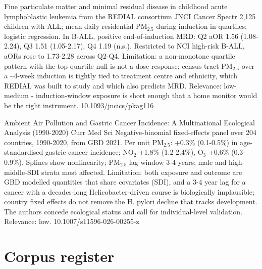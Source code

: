 \documentclass[10pt]{article}
\begin{document}
{Fine particulate matter and minimal residual disease in childhood acute lymphoblastic leukemia from the REDIAL consortium}
{JNCI Cancer Spectr}
{2,125 children with ALL; mean daily residential PM$_{2.5}$ during induction in quartiles; logistic regression. In B-ALL, positive end-of-induction MRD: Q2 aOR 1.56 (1.08-2.24), Q3 1.51 (1.05-2.17), Q4 1.19 (n.s.). Restricted to NCI high-risk B-ALL, aORs rose to 1.73-2.28 across Q2-Q4. Limitation: a non-monotone quartile pattern with the top quartile null is not a dose-response; census-tract PM$_{2.5}$ over a \textasciitilde{}4-week induction is tightly tied to treatment centre and ethnicity, which REDIAL was built to study and which also predicts MRD. Relevance: low-medium - induction-window exposure is short enough that a home monitor would be the right instrument.}
{10.1093/jncics/pkag116}

{Ambient Air Pollution and Gastric Cancer Incidence: A Multinational Ecological Analysis (1990-2020)}
{Curr Med Sci}
{Negative-binomial fixed-effects panel over 204 countries, 1990-2020, from GBD 2021. Per unit PM$_{2.5}$: +0.3\% (0.1-0.5\%) in age-standardised gastric cancer incidence; NO$_2$ +1.8\% (1.2-2.4\%), O$_3$ +0.6\% (0.3-0.9\%). Splines show nonlinearity; PM$_{2.5}$ lag window 3-4 years; male and high-middle-SDI strata most affected. Limitation: both exposure and outcome are GBD modelled quantities that share covariates (SDI), and a 3-4 year lag for a cancer with a decades-long Helicobacter-driven course is biologically implausible; country fixed effects do not remove the H. pylori decline that tracks development. The authors concede ecological status and call for individual-level validation. Relevance: low.}
{10.1007/s11596-026-00255-z}

\clearpage
\section*{\sffamily\bfseries\color{Deep}Corpus register}
\vspace{-1.5mm}{\color{Amber}\rule{\linewidth}{1.1pt}}\vspace{2.5mm}



\vspace{2mm}
\end{document}
